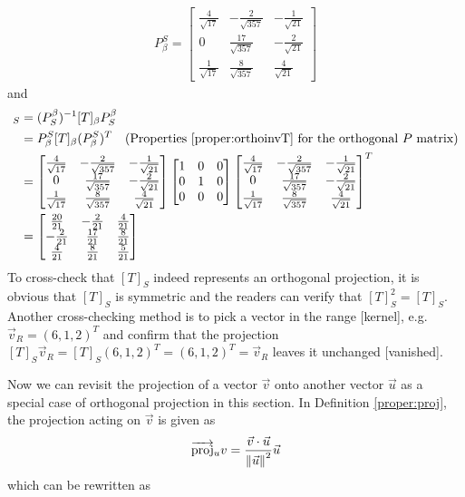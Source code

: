 \begin{solution}
\begin{align*}
P_\beta^S = 
\begin{bmatrix}
\frac{4}{\sqrt{17}} & -\frac{2}{\sqrt{357}} & -\frac{1}{\sqrt{21}} \\
0 & \frac{17}{\sqrt{357}} & -\frac{2}{\sqrt{21}} \\
\frac{1}{\sqrt{17}} & \frac{8}{\sqrt{357}} & \frac{4}{\sqrt{21}}
\end{bmatrix}
\end{align*}
and
\begin{align*}
[T]_S &= (P_S^\beta)^{-1} [T]_\beta P_S^\beta \\
&= P_\beta^S [T]_\beta (P_\beta^S)^T \text{\quad (Properties \ref{proper:orthoinvT} for the orthogonal $P$ matrix)} \\
&=
\begin{bmatrix}
\frac{4}{\sqrt{17}} & -\frac{2}{\sqrt{357}} & -\frac{1}{\sqrt{21}} \\
0 & \frac{17}{\sqrt{357}} & -\frac{2}{\sqrt{21}} \\
\frac{1}{\sqrt{17}} & \frac{8}{\sqrt{357}} & \frac{4}{\sqrt{21}}
\end{bmatrix}
\begin{bmatrix}
1 & 0 & 0 \\
0 & 1 & 0 \\
0 & 0 & 0
\end{bmatrix}
\begin{bmatrix}
\frac{4}{\sqrt{17}} & -\frac{2}{\sqrt{357}} & -\frac{1}{\sqrt{21}} \\
0 & \frac{17}{\sqrt{357}} & -\frac{2}{\sqrt{21}} \\
\frac{1}{\sqrt{17}} & \frac{8}{\sqrt{357}} & \frac{4}{\sqrt{21}}
\end{bmatrix}^T \\
&=
\begin{bmatrix}
\frac{20}{21}&-\frac{2}{21}&\frac{4}{21}\\ 
-\frac{2}{21}&\frac{17}{21}&\frac{8}{21}\\ 
\frac{4}{21}&\frac{8}{21}&\frac{5}{21}
\end{bmatrix}
\end{align*}
To cross-check that $[T]_S$ indeed represents an orthogonal projection, it is obvious that $[T]_S$ is symmetric and the readers can verify that $[T]_S^2 = [T]_S$. Another cross-checking method is to pick a vector in the range [kernel], e.g.\ $\vec{v}_R = (6,1,2)^T$ and confirm that the projection $[T]_S\vec{v}_R = [T]_S(6,1,2)^T = (6,1,2)^T = \vec{v}_R$ leaves it unchanged [vanished].
\end{solution}
Now we can revisit the projection of a vector $\vec{v}$ onto another vector $\vec{u}$ as a special case of orthogonal projection in this section. In Definition \ref{proper:proj}, the projection acting on $\vec{v}$ is given as \begin{align*}
\overrightarrow{\text{proj}}_u v = \frac{\vec{v} \cdot \vec{u}}{\norm{\vec{u}}^2} \vec{u}    
\end{align*} which can be rewritten as

